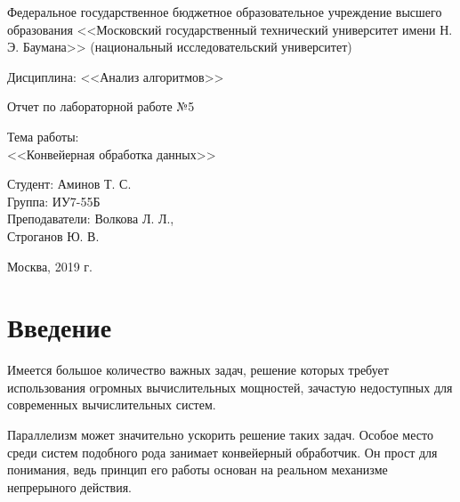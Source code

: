 \documentclass[a4paper,12pt]{article}
\begin{document}
\large
\begin{center}
Федеральное государственное бюджетное образовательное учреждение 
высшего образования <<Московский государственный технический 
университет имени Н. Э. Баумана>> 
(национальный исследовательский университет)
\end{center}

\vspace*{30mm} 

\LARGE
\begin{center}
Дисциплина: <<Анализ алгоритмов>>

Отчет по лабораторной работе №5
\end{center}

\vspace*{30mm} 

\huge
\begin{center}
Тема работы:\\
<<Конвейерная обработка данных>>
\end{center}
\vspace*{30mm} 

\large
\begin{flushright}
Студент: Аминов Т. С. \\
Группа: ИУ7-55Б \\
Преподаватели: Волкова Л. Л., \\ Строганов Ю. В. \\
\end{flushright}

\vspace*{40mm}
\begin{center}
Москва, 2019 г.  
\end{center}
\thispagestyle{empty}




\tableofcontents

\newpage

\section*{Введение}

Имеется большое количество важных задач, решение которых требует использования огромных вычислительных мощностей, зачастую недоступных для современных 
вычислительных систем.

Параллелизм может значительно ускорить решение
таких задач. Особое место среди систем подобного рода занимает
конвейерный обработчик. Он прост для понимания,
ведь принцип его работы основан на реальном механизме
непрерыного действия. ~\cite{voev}
\end{document}
